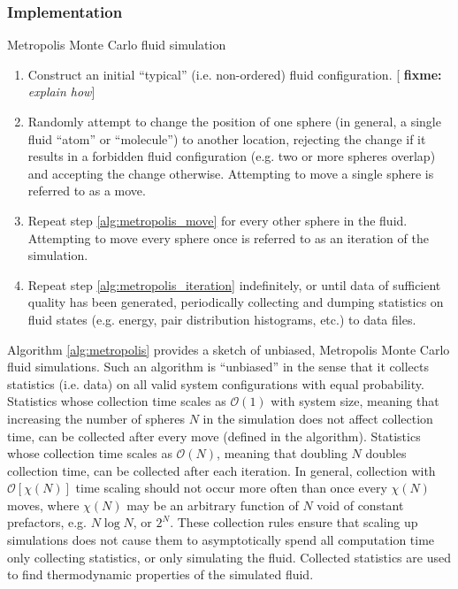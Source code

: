 \documentclass[11pt]{article}
\newcommand{\p}[1]{\left(#1\right)} %
\renewcommand{\sp}[1]{\left[#1\right]} %
\newenvironment{alg}
{\hrulefill\begin{enumerate}}
{\end{enumerate}\hrulefill}
\newcommand{\red}[1]{{\bf \color{red} #1}}
\newcommand{\fixme}[1]{[\red{fixme:} \emph{#1}]}
\begin{document}
\subsubsection{Implementation}
\label{sec:mc_implementation}

\begin{algorithm}[tb]
  \caption{Metropolis Monte Carlo fluid simulation}
  \label{alg:metropolis}
  \begin{alg}

  \item Construct an initial ``typical'' (i.e. non-ordered) fluid
    configuration. \fixme{explain how}

  \item Randomly attempt to change the position of one sphere (in
    general, a single fluid ``atom'' or ``molecule'') to another
    location, rejecting the change if it results in a forbidden fluid
    configuration (e.g. two or more spheres overlap) and accepting the
    change otherwise. Attempting to move a single sphere is referred
    to as a move. \label{alg:metropolis_move}

  \item Repeat step \ref{alg:metropolis_move} for every other sphere
    in the fluid. Attempting to move every sphere once is referred to
    as an iteration of the simulation.
    \label{alg:metropolis_iteration}

  \item Repeat step \ref{alg:metropolis_iteration} indefinitely, or
    until data of sufficient quality has been generated, periodically
    collecting and dumping statistics on fluid states (e.g. energy,
    pair distribution histograms, etc.) to data files.

  \end{alg}
\end{algorithm}

Algorithm \ref{alg:metropolis} provides a sketch of unbiased,
Metropolis Monte Carlo fluid simulations. Such an algorithm is
``unbiased'' in the sense that it collects statistics (i.e. data) on
all valid system configurations with equal probability. Statistics
whose collection time scales as $\mathcal O\p{1}$ with system size,
meaning that increasing the number of spheres $N$ in the simulation
does not affect collection time, can be collected after every move
(defined in the algorithm). Statistics whose collection time scales as
$\mathcal O\p{N}$, meaning that doubling $N$ doubles collection time,
can be collected after each iteration. In general, collection with
$\mathcal O\sp{\chi\p{N}}$ time scaling should not occur more often
than once every $\chi\p{N}$ moves, where $\chi\p{N}$ may be an
arbitrary function of $N$ void of constant prefactors, e.g. $N\log N$,
or $2^N$. These collection rules ensure that scaling up simulations
does not cause them to asymptotically spend all computation time only
collecting statistics, or only simulating the fluid. Collected
statistics are used to find thermodynamic properties of the simulated
fluid.
\end{document}
